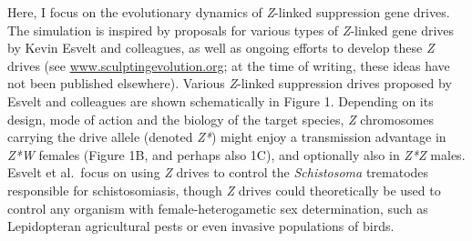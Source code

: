 \documentclass[]{rsos}%
\begin{document}
Here, I focus on the evolutionary dynamics of \emph{Z}-linked
suppression gene drives. The simulation is inspired by proposals for
various types of \emph{Z}-linked gene drives by Kevin Esvelt and
colleagues, as well as ongoing efforts to develop these \emph{Z} drives
(see \href{}{www.sculptingevolution.org}; at the time of writing, these
ideas have not been published elsewhere). Various \emph{Z}-linked
suppression drives proposed by Esvelt and colleagues are shown
schematically in Figure 1. Depending on its design, mode of action and
the biology of the target species, \emph{Z} chromosomes carrying the
drive allele (denoted \emph{Z*}) might enjoy a transmission advantage in
\emph{Z*W} females (Figure 1B, and perhaps also 1C), and optionally also
in \emph{Z*Z} males. Esvelt et al.~focus on using \emph{Z} drives to
control the \emph{Schistosoma} trematodes responsible for
schistosomiasis, though \emph{Z} drives could theoretically be used to
control any organism with female-heterogametic sex determination, such
as Lepidopteran agricultural pests or even invasive populations of
birds.
\end{document}
